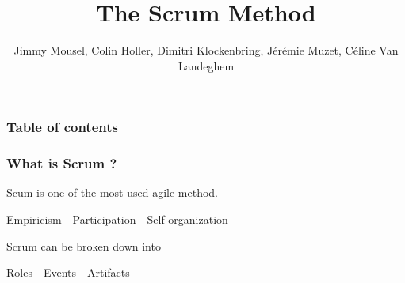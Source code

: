 \documentclass{beamer}
\title{The Scrum Method}
\author{Jimmy Mousel, Colin Holler, Dimitri Klockenbring, Jérémie Muzet, Céline Van Landeghem}
\date{}
\begin{document}
\frame{\titlepage}


\begin{frame}
    \frametitle{Table of contents}
    
    
    
\end{frame}

\begin{frame}
    \frametitle{What is Scrum ?}
    
    
    \begin{block}
         Scum is one of the most used agile method.
        \begin{center}
             Empiricism  - Participation  - Self-organization
        \end{center}

    \end{block}

    \pause
    
    \begin{block}
         Scrum can be broken down into
        
        \begin{center}
             Roles  - Events  - Artifacts
        \end{center}
    \end{block}
    
\end{frame}
\end{document}
